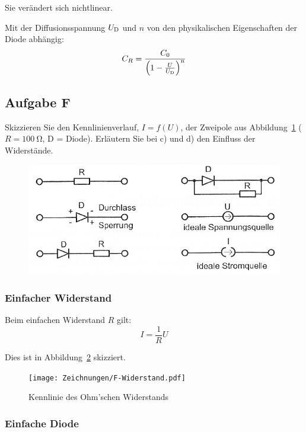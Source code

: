 Sie verändert sich nichtlinear. \cite[§15.2.2]{beuth/elementare_elektronik}

Mit der Diffusionsspannung $U_\text D$ und $n$ von den physikalischen
Eigenschaften der Diode abhängig:
\cite[§1.1.1.1.2]{antula/schaltungen_mikroelektronik}
\[
	C_R = \frac{C_0}{\del{1- \frac U{U_\text D}}^n}
\]

\FloatBarrier
\subsection{Aufgabe F}

\begin{problem}
	Skizzieren Sie den Kennlinienverlauf, $I = f(U)$, der Zweipole aus
	Abbildung~\ref{fig:2-3} ($R = \SI{100}\ohm$, D = Diode). Erläutern Sie bei
	c) und d) den Einfluss der Widerstände.
\end{problem}

\begin{figure}[htbp]
	\centering
	\caption{%
		\cite[Abbildung~2.3]{physik313-Anleitung}
	}
	\label{fig:2-3}
	\includegraphics[width=.6\linewidth]{Bilder_aus_Anleitung/2-3.png}
\end{figure}

\FloatBarrier
\subsubsection{Einfacher Widerstand}

Beim einfachen Widerstand $R$ gilt:
\[
	I = \frac 1R U
\]

Dies ist in Abbildung~\ref{fig:F-Widerstand} skizziert.

\begin{figure}[htbp]
	\centering
	\caption{%
		Kennlinie des Ohm'schen Widerstands
	}
	\label{fig:F-Widerstand}
	\texttt{[image: Zeichnungen/F-Widerstand.pdf]}
\end{figure}

\FloatBarrier
\subsubsection{Einfache Diode}

